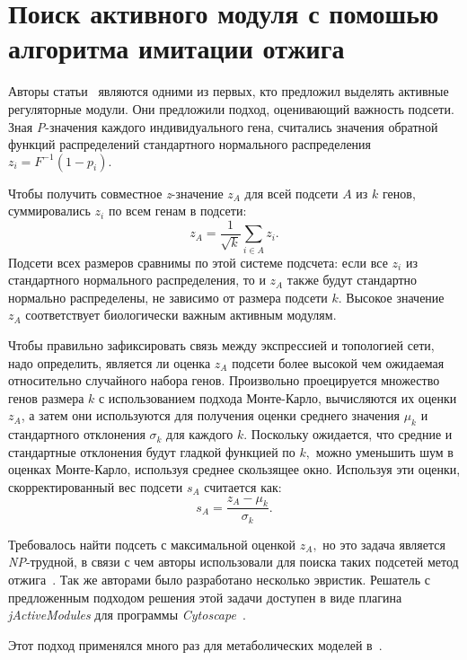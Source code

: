 \section{Поиск активного модуля с помошью алгоритма имитации отжига}

Авторы статьи~\cite{Ideker2002} являются одними из первых, кто предложил выделять
активные регуляторные модули.  Они предложили подход, оценивающий важность
подсети. Зная \emph{P}-значения каждого индивидуального гена, считались
значения обратной функций распределений стандартного нормального распределения
$z_i = F^{-1}(1 - p_i).$

Чтобы получить совместное \emph{z}-значение $z_A$ для всей подсети $A$ из $k$
генов, суммировались $z_i$ по всем генам в подсети:
\begin{equation}\label{eq:zA}
z_A = \frac{1}{\sqrt{k}}\sum_{i \in A} z_i.
\end{equation}
Подсети всех размеров сравнимы по этой системе подсчета: если все $z_i$ из
стандартного нормального распределения, то и $z_A$ также будут стандартно
нормально распределены, не зависимо от размера подсети $k$.  Высокое значение
$z_A$ соответствует биологически важным активным модулям.

Чтобы правильно зафиксировать связь между экспрессией и топологией сети,
надо определить, является ли оценка $z_A$ подсети более высокой чем ожидаемая
относительно случайного набора генов. Произвольно проецируется множество генов
размера $k$ с использованием подхода Монте-Карло, вычисляются их оценки $z_A$,
а затем они используются для получения оценки среднего значения $\mu_k$ и
стандартного отклонения $\sigma_k$ для каждого $k.$ Поскольку ожидается, что
средние и стандартные отклонения будут гладкой функцией по $k,$ можно уменьшить
шум в оценках Монте-Карло, используя среднее скользящее окно. Используя эти
оценки, скорректированный вес подсети $s_A$ считается как:
\[s_A = \frac{z_A - \mu_k}{\sigma_k}.\]

Требовалось найти подсеть с максимальной оценкой $z_A,$ но это задача является
\emph{NP}-трудной, в связи с чем авторы использовали для поиска таких подсетей
метод отжига~\cite{Kirkpatrick1983}. Так же авторами было разработано несколько
эвристик. Решатель с предложенным подходом решения этой задачи доступен в виде
плагина \emph{jActiveModules} для программы
\emph{Cytoscape}~\cite{Shannon2003}.

Этот подход применялся много раз для метаболических моделей
в~\cite{Patil2005,Mardinoglu2013,Mardinoglu2015}.






